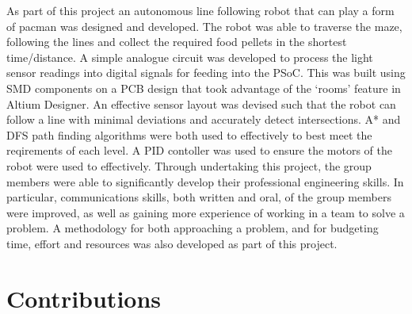 \documentclass{article}
\begin{document}
As part of this project an autonomous line following robot that can play a form of pacman was designed and developed. The robot was able to traverse the maze, following the lines and collect the required food pellets in the shortest time/distance. A simple analogue circuit was developed to process the light sensor readings into digital signals for feeding into the PSoC. This was built using SMD components on a PCB design that took advantage of the `rooms' feature in Altium Designer. An effective sensor layout was devised such that the robot can follow a line with minimal deviations and accurately detect intersections. A* and DFS path finding algorithms were both used to effectively to best meet the reqirements of each level. A PID contoller was used to ensure the motors of the robot were used to effectively. Through undertaking this project, the group members were able to significantly develop their professional engineering skills. In particular, communications skills, both written and oral, of the group members were improved, as well as gaining more experience of working in a team to solve a problem. A methodology for both approaching a problem, and for budgeting time, effort and resources was also developed as part of this project.

\clearpage

\section{Contributions}
\end{document}

